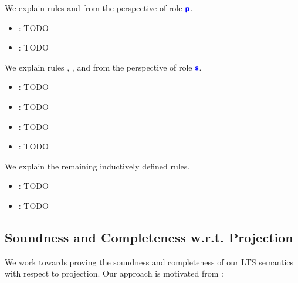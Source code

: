 We explain rules  and 
from the perspective of role ${\color{blue}\bm{\mathsf{p}}}$.

\begin{itemize}

\item {}: 
TODO

\item {}:
TODO

\end{itemize}

We explain rules , ,
 and 
from the perspective of role ${\color{blue}\bm{\mathsf{s}}}$.

\begin{itemize}

\item {}:
TODO

\item {}:
TODO

\item {}:
TODO

\item {}:
TODO

\end{itemize}

We explain the remaining inductively defined rules.

\begin{itemize}

\item {}:
TODO

\item {}:
TODO

\end{itemize}


\subsection{Soundness and Completeness w.r.t. Projection}
\label{subsection:newtraceeq}

We work towards proving the soundness and completeness
of our LTS semantics with respect to projection.
Our approach is motivated from \cite{characterisation}:

